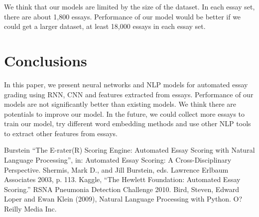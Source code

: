 \documentclass[11pt,conference]{IEEEtran}
\begin{document}
We think that our models are limited by the size of the dataset. In each essay set, there are about 1,800 essays. Performance of our model would be better if we could get a larger dataset, at least 18,000 essays in each essay set. 

\section{Conclusions}

In this paper, we present neural networks and NLP models for automated essay grading using RNN, CNN and features extracted from essays. Performance of our models are not significantly better than existing models. We think there are potentials to improve our model. In the future, we could collect more essays to train our model, try different word embedding methods and use other NLP tools to extract other features from essays. 

\begin{thebibliography}{00}
 Burstein ``The E-rater(R) Scoring Engine: Automated Essay Scoring with Natural Language Processing'', in: Automated Essay Scoring: A Cross-Disciplinary Perspective. Shermis, Mark D., and Jill Burstein, eds. Lawrence Erlbaum Associates 2003, p. 113.
 Kaggle, ``The Hewlett Foundation: Automated Essay Scoring.'' RSNA Pneumonia Detection Challenge  2010.
 Bird, Steven, Edward Loper and Ewan Klein (2009), Natural Language Processing with Python. O?Reilly Media Inc.
\end{thebibliography}
\vspace{12pt}
\end{document}
